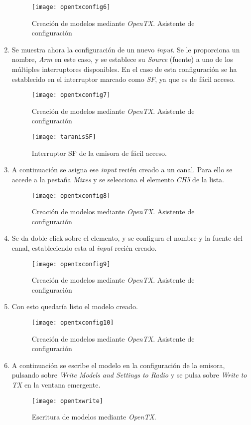\begin{enumerate}
\begin{figure}[H]
	\centering
	\texttt{[image: opentxconfig6]}
	\caption[Creación de modelos OpenTX. 6]{Creación de modelos mediante \emph{OpenTX}. Asistente de configuración}\label{fig:opentxconfig6}
\end{figure}
\item Se muestra ahora la configuración de un nuevo \emph{input}. Se le proporciona un nombre, \emph{Arm} en este caso, y se establece su \emph{Source} (fuente) a uno de los múltiples interruptores disponibles. En el caso de esta configuración se ha establecido en el interruptor marcado como \emph{SF}, ya que es de fácil acceso.
\begin{figure}[H]
	\centering
	\texttt{[image: opentxconfig7]}
	\caption[Creación de modelos OpenTX. 7]{Creación de modelos mediante \emph{OpenTX}. Asistente de configuración}\label{fig:opentxconfig7}
\end{figure}
\begin{figure}[H]
	\centering
	\texttt{[image: taranisSF]}
	\caption[Interruptor SF de la emisora]{Interruptor SF de la emisora de fácil acceso.}\label{fig:taranisSFswitch}
\end{figure}

\item A continuación se asigna ese \emph{input} recién creado a un canal. Para ello se accede a la pestaña \emph{Mixes} y se selecciona el elemento \emph{CH5} de la lista.
\begin{figure}[H]
	\centering
	\texttt{[image: opentxconfig8]}
	\caption[Creación de modelos OpenTX. 8]{Creación de modelos mediante \emph{OpenTX}. Asistente de configuración}\label{fig:opentxconfig8}
\end{figure} 
\item Se da doble click sobre el elemento, y se configura el nombre y la fuente del canal, estableciendo esta al \emph{input} recién creado.
\begin{figure}[H]
	\centering
	\texttt{[image: opentxconfig9]}
	\caption[Creación de modelos OpenTX. 9]{Creación de modelos mediante \emph{OpenTX}. Asistente de configuración}\label{fig:opentxconfig9}
\end{figure}
\item Con esto quedaría listo el modelo creado. 
\begin{figure}[H]
	\centering
	\texttt{[image: opentxconfig10]}
	\caption[Creación de modelos OpenTX. 10]{Creación de modelos mediante \emph{OpenTX}. Asistente de configuración}\label{fig:opentxconfig10}
\end{figure}
\item A continuación se escribe el modelo en la configuración de la emisora, pulsando sobre \emph{Write Models and Settings to Radio} y se pulsa sobre \emph{Write to TX} en la ventana emergente.
\begin{figure}[H]
	\centering
	\texttt{[image: opentxwrite]}
	\caption[Escritura de modelos OpenTX.]{Escritura de modelos mediante \emph{OpenTX}.}\label{fig:opentxwrite}
\end{figure}
\end{enumerate}

